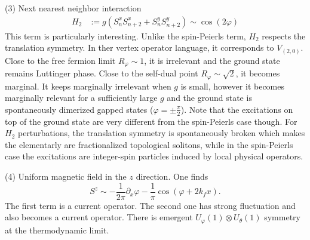 (3) Next nearest neighbor interaction
\begin{equation}
	\begin{aligned}
		H_2 & := g \left( S^x_n S^x_{n+2} + S^y_n S^y_{n+2} \right) \sim \cos (2 \varphi)
	\end{aligned}	
\end{equation}
This term is particularly interesting. Unlike the spin-Peierls term, $H_2$ respects the translation symmetry. In ther vertex operator language, it corresponds to $V_{(2,0)}$. Close to the free fermion limit $R_\varphi \sim 1$, it is irrelevant and the ground state remains Luttinger phase. Close to the self-dual point $R_\varphi \sim \sqrt{2}$, it becomes marginal. It keeps marginally irrelevant when $g$ is small, however it becomes marginally relevant for a sufficiently large $g$ and the ground state is spontaneously dimerized gapped states ($\varphi = \pm \frac{\pi}{2}$). Note that the excitations on top of the ground state are very different from the spin-Peierls case though. For $H_2$ perturbations, the translation symmetry is spontaneously broken which makes the elementarly are fractionalized topological solitons, while in the spin-Peierls case the excitations are integer-spin particles induced by local physical operators.


(4) Uniform magnetic field in the $z$ direction.
One finds
\begin{equation}
	S^z \sim - \frac{1}{2\pi}\partial_x \varphi - \frac{1}{\pi}\cos (\varphi + 2k_f x).
\end{equation}
The first term is a current operator. The second one has strong fluctuation and also becomes a current operator. There is emergent $U_\varphi(1) \otimes U_{\theta}(1)$ symmetry at the thermodynamic limit.\\